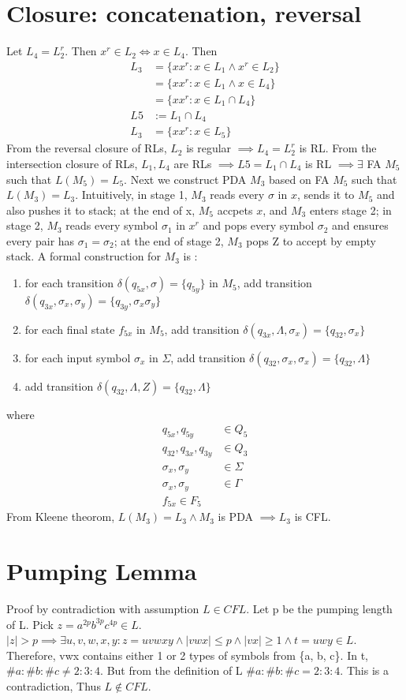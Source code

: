 \documentclass{article}
\begin{document}
\section{Closure: concatenation, reversal}
Let $L_4 = L_2^r$. Then $x^r \in L_2 \iff x \in L_4$. Then
\begin{align*}
L_3
&= \{xx^r : x \in L_1 \land x^r \in L_2\}\\
&= \{xx^r : x \in L_1 \land x \in L_4\}\\
&= \{xx^r : x \in L_1 \cap L_4\}\\
L5 &:= L_1 \cap L_4\\
L_3
&= \{xx^r : x \in L_5\}
\end{align*}
From the reversal closure of RLs, $L_2$ is regular $\implies L_4 =
L_2^r$ is RL. From the intersection closure of RLs, $L_1,
L_4$ are RLs $\implies L5 = L_1 \cap L_4$ is RL $\implies
\exists$ FA $M_5$ such that $ L(M_5) = L_5$. Next we construct PDA $M_3$ based
on FA $M_5$ such that $L(M_3) = L_3$. Intuitively, in stage 1, $M_3$ reads every
$\sigma$ in $x$, sends it to $M_5$ and also pushes it to stack; at the end of
x, $M_5$ accpets $x$, and $M_3$ enters stage 2; in stage 2, $M_3$ reads every
symbol $\sigma_1$ in $x^r$ and pops every symbol $\sigma_2$ and ensures every
pair has $\sigma_1 = \sigma_2$; at the end of stage 2, $M_3$ pops Z to accept by
empty stack. A formal construction for $M_3$ is :
\begin{enumerate}
  \item for each transition $\delta(q_{5x}, \sigma) = \{q_{5y}\}$ in $M_5$, add
  transition $\delta(q_{3x}, \sigma_x, \sigma_y) = \{q_{3y}, \sigma_x
  \sigma_y\}$
  \item for each final state $f_{5x}$ in $M_5$, add transition $\delta(q_{3x},
  \Lambda, \sigma_x) = \{q_{32}, \sigma_x\}$
  \item for each input symbol $\sigma_x$ in $\Sigma$, add transition
  $\delta(q_{32}, \sigma_x, \sigma_x) = \{q_{32}, \Lambda\}$
  \item add transition $\delta(q_{32}, \Lambda, Z) = \{q_{32}, \Lambda\}$
\end{enumerate}
where
\begin{align*}
q_{5x}, q_{5y} &\in Q_5\\
q_{32}, q_{3x}, q_{3y} &\in Q_3\\
\sigma_x, \sigma_y &\in \Sigma\\
\sigma_x, \sigma_y &\in \Gamma\\
f_{5x} \in F_5
\end{align*}
From Kleene theorom, $L(M_3) = L_3 \land M_3$ is PDA $\implies L_3$ is CFL.
\section{Pumping Lemma}
Proof by contradiction with assumption $L \in CFL$. Let p be the pumping length
of L. Pick $z = a^{2p}b^{3p}c^{4p} \in L$.$ \mid z \mid > p \implies \exists
u, v, w, x, y: z = uvwxy \land \mid vwx \mid \leq p \land \mid vx \mid \geq 1
\land t =uwy \in L$. Therefore, vwx contains either 1 or 2 types of symbols from
\{a, b, c\}. In t, $\#a:\#b:\#c \neq 2:3:4$. But from the definition of L
$\#a:\#b:\#c = 2:3:4$.  This is a contradiction, Thus $L \notin CFL$.
\end{document}
